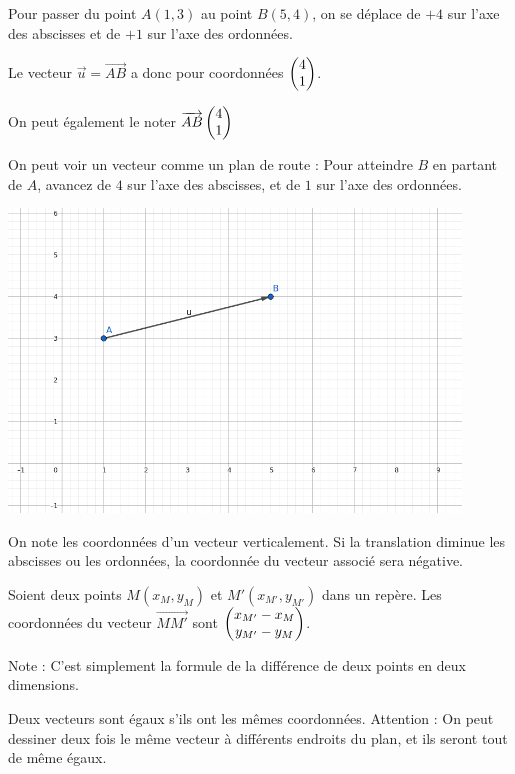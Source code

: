 \documentclass[10pt,a4paper,oneside]{book}
\begin{document}
\begin{minipage}{0.25\textwidth}
    
Pour passer du point $A(1,3)$ au point $B(5,4)$, on se déplace de $+4$ sur l'axe des abscisses et de $+1$ sur l'axe des ordonnées.

Le vecteur $\overrightarrow{u}=\overrightarrow{AB}$ a donc pour coordonnées $ \begin{pmatrix} 4\\ 1 \end{pmatrix}$.

On peut également le noter $\overrightarrow{AB} \begin{pmatrix} 4\\ 1 \end{pmatrix}$

On peut voir un vecteur comme un plan de route : Pour atteindre $B$ en partant de $A$, avancez de $4$ sur l'axe des abscisses, et de $1$ sur l'axe des ordonnées.

\end{minipage}
\begin{minipage}{0.7\textwidth}
    \centering
    \includegraphics[width=0.9\textwidth]{vecteurExemple.png} 
\end{minipage}

On note les coordonnées d'un vecteur verticalement. Si la translation diminue les abscisses ou les ordonnées, la coordonnée du vecteur associé sera négative.

\begin{prop}
    Soient deux points $M(x_M,y_M)$ et $M'(x_{M'},y_{M'})$ dans un repère. Les coordonnées du vecteur $\overrightarrow{MM'}$ sont $ \begin{pmatrix} x_{M'}-x_{M}\\ y_{M'}-y_{M} \end{pmatrix}$.
\end{prop}

Note : C'est simplement la formule de la différence de deux points en deux dimensions.


\begin{de}
    Deux vecteurs sont égaux s'ils ont les mêmes coordonnées. Attention : On peut dessiner deux fois le même vecteur à différents endroits du plan, et ils seront tout de même égaux.
\end{de}
\end{document}
